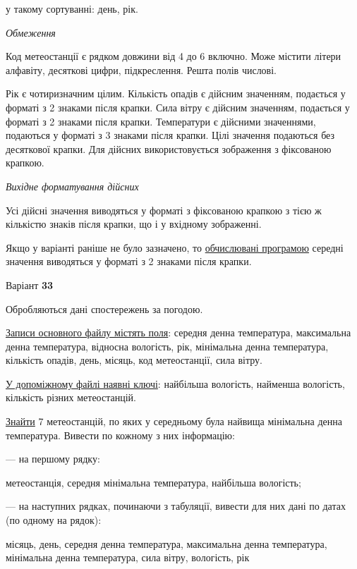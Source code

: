 \documentclass[11pt, ukrainian]{article}
\begin{document}
{\noindent}у такому сортуванні: день, рік.


\bigskip\textit{Обмеження}

Код метеостанції є рядком довжини від 4 до 6 включно.
Може містити літери алфавіту, десяткові цифри, підкреслення. Решта полів числові.

Рік є чотиризначним цілим.
Кількість опадів є дійсним значенням, подається у форматі з 2 знаками після крапки.
Сила вітру є дійсним значенням, подається у форматі з 2 знаками після крапки.
Температури є дійсними значеннями, подаються у форматі з 3 знаками після крапки.
Цілі значення подаються без десяткової крапки.
Для дійсних використовується зображення з фіксованою крапкою.

\textit{Вихідне форматування дійсних}

Усі дійсні значення виводяться у форматі з фіксованою крапкою з тією ж кількістю знаків після крапки, що і у вхідному зображенні.

Якщо у варіанті раніше не було зазначено, то \underline{обчислювані програмою} середні значення виводяться у форматі з 2 знаками після крапки.


\par
\newpage
{\center Варіант  \No \textbf { 33 }\par}
\bigskip
Обробляються дані спостережень за погодою. 

\underline{Записи основного файлу містять поля}: середня денна температура, максимальна денна температура, відносна вологість, рік, мінімальна денна температура, кількість опадів, день, місяць, код метеостанції, сила вітру.

\underline{У допоміжному файлі наявні ключі}: найбільша вологість, найменша вологість, кількість різних метеостанцій.

\underline{Знайти} 7 метеостанцій, по яких у середньому була найвища мінімальна денна температура. Вивести по кожному з них інформацію:\par
{\noindent}--- на першому рядку:\par
метеостанція, середня мінімальна температура, найбільша вологість;

{\noindent}--- на наступних рядках, починаючи з табуляції, вивести для них дані по датах (по одному на рядок):\par
місяць, день, середня денна температура, максимальна денна температура, мінімальна денна температура, сила вітру, вологість, рік
\end{document}

